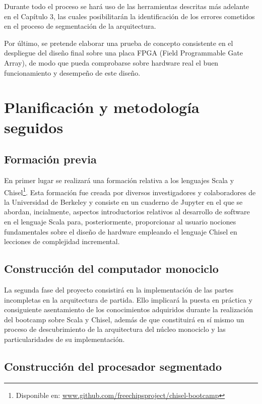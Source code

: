 Durante todo el proceso se hará uso de las herramientas descritas más adelante en el Capítulo 3, las cuales posibilitarán la identificación de los errores cometidos en el proceso de segmentación de la arquitectura.

Por último, se pretende elaborar una prueba de concepto consistente en el despliegue del diseño final sobre una placa FPGA (Field Programmable Gate Array), de modo que pueda comprobarse sobre hardware real el buen funcionamiento y desempeño de este diseño.


\section{Planificación y metodología seguidos}

\subsection{Formación previa}

En primer lugar se realizará una formación relativa a los lenguajes Scala y Chisel\footnote{Disponible en: \url{www.github.com/freechipsproject/chisel-bootcamp}}. Esta formación fue creada por diversos investigadores y colaboradores de la Universidad de Berkeley y consiste en un cuaderno de Jupyter en el que se abordan, incialmente, aspectos introductorios relativos al desarrollo de software en el lenguaje Scala para, posteriormente, proporcionar al usuario nociones fundamentales sobre el diseño de hardware empleando el lenguaje Chisel en lecciones de complejidad incremental.

\subsection{Construcción del computador monociclo}

La segunda fase del proyecto consistirá en la implementación de las partes incompletas en la arquitectura de partida. Ello implicará la puesta en práctica y consiguiente asentamiento de los conocimientos adquiridos durante la realización del bootcamp sobre Scala y Chisel, además de que constituirá en sí mismo un proceso de descubrimiento de la arquitectura del núcleo monociclo y las particularidades de su implementación.

\subsection{Construcción del procesador segmentado}

